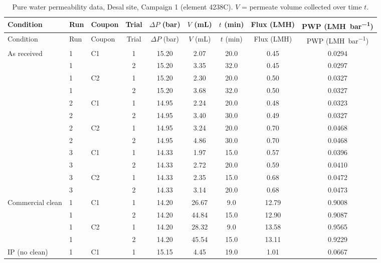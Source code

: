 {\footnotesize\setlength{\tabcolsep}{4pt}
\begin{longtable}{>{\raggedright\arraybackslash}p{2.2cm}llcccccc}
  \caption{Pure water permeability data, Desal site, Campaign 1 (element 4238C). $V$ = permeate volume collected over time $t$.}
  \label{tab:app-c1-4238C-pwp}\\
  \toprule
  Condition & Run & Coupon & Trial & $\Delta P$ (\unit{bar}) & $V$ (\unit{mL}) & $t$ (\unit{min}) & Flux (\unit{LMH}) & PWP (\unit{LMH.bar^{-1}}) \\
  \midrule
  \endfirsthead
  \toprule
  Condition & Run & Coupon & Trial & $\Delta P$ (\unit{bar}) & $V$ (\unit{mL}) & $t$ (\unit{min}) & Flux (\unit{LMH}) & PWP (\unit{LMH.bar^{-1}}) \\
  \midrule
  \endhead
    As received & 1 & C1 & 1 & 15.20 & 2.07 & 20.0 & 0.45 & 0.0294 \\
     & 1 &  & 2 & 15.20 & 3.35 & 32.0 & 0.45 & 0.0297 \\
    \addlinespace[2pt]
     & 1 & C2 & 1 & 15.20 & 2.30 & 20.0 & 0.50 & 0.0327 \\
     & 1 &  & 2 & 15.20 & 3.68 & 32.0 & 0.50 & 0.0327 \\
    \addlinespace[2pt]
     & 2 & C1 & 1 & 14.95 & 2.24 & 20.0 & 0.48 & 0.0323 \\
     & 2 &  & 2 & 14.95 & 3.40 & 30.0 & 0.49 & 0.0327 \\
    \addlinespace[2pt]
     & 2 & C2 & 1 & 14.95 & 3.24 & 20.0 & 0.70 & 0.0468 \\
     & 2 &  & 2 & 14.95 & 4.86 & 30.0 & 0.70 & 0.0468 \\
    \addlinespace[2pt]
     & 3 & C1 & 1 & 14.33 & 1.97 & 15.0 & 0.57 & 0.0396 \\
     & 3 &  & 2 & 14.33 & 2.72 & 20.0 & 0.59 & 0.0410 \\
    \addlinespace[2pt]
     & 3 & C2 & 1 & 14.33 & 2.35 & 15.0 & 0.68 & 0.0472 \\
     & 3 &  & 2 & 14.33 & 3.14 & 20.0 & 0.68 & 0.0473 \\
    \midrule
    Commercial clean & 1 & C1 & 1 & 14.20 & 26.67 & 9.0 & 12.79 & 0.9008 \\
     & 1 &  & 2 & 14.20 & 44.84 & 15.0 & 12.90 & 0.9087 \\
    \addlinespace[2pt]
     & 1 & C2 & 1 & 14.20 & 28.32 & 9.0 & 13.58 & 0.9565 \\
     & 1 &  & 2 & 14.20 & 45.54 & 15.0 & 13.11 & 0.9229 \\
    \midrule
    IP (no clean) & 1 & C1 & 1 & 15.15 & 4.45 & 19.0 & 1.01 & 0.0667 \\

\end{longtable}}
